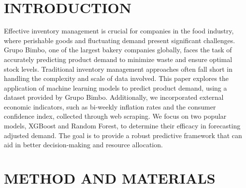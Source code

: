 \documentclass[letterpaper, 10 pt, conference]{ieeeconf}  %
\begin{document}
\section{INTRODUCTION}
Effective inventory management is crucial for companies in the food industry, where perishable goods and fluctuating demand present significant challenges. Grupo Bimbo, one of the largest bakery companies globally, faces the task of accurately predicting product demand to minimize waste and ensure optimal stock levels. Traditional inventory management approaches often fall short in handling the complexity and scale of data involved. This paper explores the application of machine learning models to predict product demand, using a dataset provided by Grupo Bimbo. Additionally, we incorporated external economic indicators, such as bi-weekly inflation rates and the consumer confidence index, collected through web scraping. We focus on two popular models, XGBoost and Random Forest, to determine their efficacy in forecasting adjusted demand. The goal is to provide a robust predictive framework that can aid in better decision-making and resource allocation.
\section{METHOD AND MATERIALS}
\end{document}

